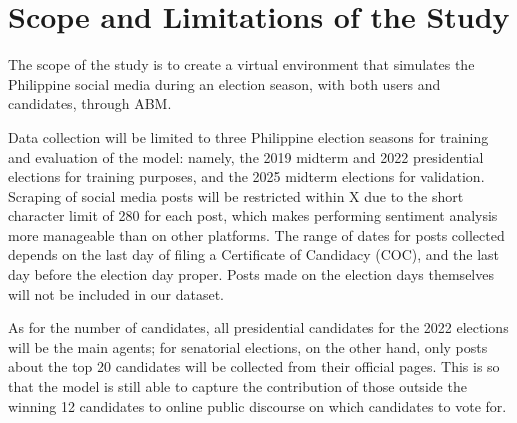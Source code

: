 \section{Scope and Limitations of the Study}
The scope of the study is to create a virtual environment that simulates the Philippine social media during an election season, with both users and candidates, through ABM.

Data collection will be limited to three Philippine election seasons for training and evaluation of the model: namely, the 2019 midterm and 2022 presidential elections for training purposes, and the 2025 midterm elections for validation. Scraping of social media posts will be restricted within X due to the short character limit of 280 for each post, which makes performing sentiment analysis more manageable than on other platforms. The range of dates for posts collected depends on the last day of filing a Certificate of Candidacy (COC), and the last day before the election day proper. Posts made on the election days themselves will not be included in our dataset.

As for the number of candidates, all presidential candidates for the 2022 elections will be the main agents; for senatorial elections, on the other hand, only posts about the top 20 candidates will be collected from their official pages. This is so that the model is still able to capture the contribution of those outside the winning 12 candidates to online public discourse on which candidates to vote for.